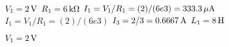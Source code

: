 
\mbox{$V_{1}=\mbox{$2 \,\mathrm{ V}$}$}
\mbox{$R_{1}=\mbox{$6 \,\mathrm{k \Omega}$}$}
\mbox{$I_{1} = V_{1}/R_{1}  =  (2)/(6e3) = \mbox{$333.3 \,\mathrm{\mu A}$}$}
\mbox{$I_{1} = V_{1}/R_{1}  =  (2)/(6e3)$}
\mbox{$I_{3}=2/3  = \mbox{$0.6667 \,\mathrm{ A}$}$}
\mbox{$L_{1}=\mbox{$8 \,\mathrm{ H}$}$}


\mbox{$V_{1}=\mbox{$2 \,\mathrm{ V}$}$}

